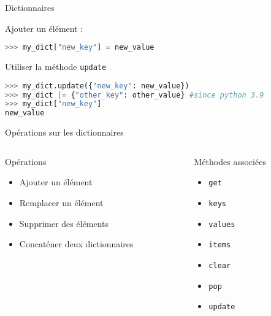\begin{frame}[fragile]{Dictionnaires}

Ajouter un élément :
\begin{lstlisting}[language=Python, morekeywords={True, false}, numbers=none]
>>> my_dict["new_key"] = new_value
\end{lstlisting}

\begin{block}{Utiliser la méthode \texttt{update}}
\begin{lstlisting}[language=Python, morekeywords={True, false}, numbers=none]
>>> my_dict.update({"new_key": new_value})
>>> my_dict |= {"other_key": other_value} #since python 3.9
>>> my_dict["new_key"]
new_value
\end{lstlisting}


\end{block}
\end{frame}



\begin{frame}{Opérations sur les dictionnaires}

  \begin{columns}[T]
    \begin{column}{.48\textwidth}
      \begin{block}{Opérations}
        \medskip
        \begin{itemize}
          \item Ajouter un élément
          \item Remplacer un élément
          \item Supprimer des éléments
          \item Concaténer deux dictionnaires
        \end{itemize}
      \end{block}
    \end{column}

    \begin{column}{.48\textwidth}
      \begin{block}{Méthodes associées}
        \medskip
        \begin{itemize}
          \item \texttt{get}
          \item \texttt{keys}
          \item \texttt{values}
          \item \texttt{items}
          \item \texttt{clear}
          \item \texttt{pop}
          \item \texttt{update}
        \end{itemize}
      \end{block}
    \end{column}
  \end{columns}
  
\end{frame}



